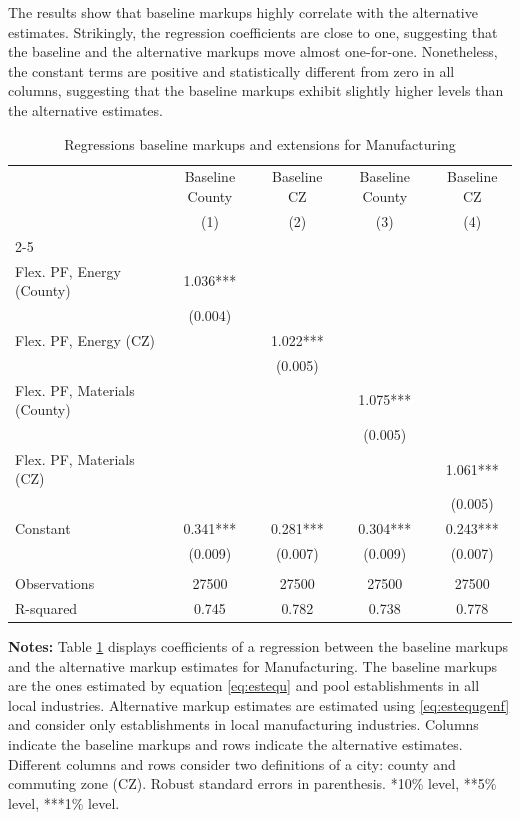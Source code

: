 The results show that baseline markups highly correlate with the alternative estimates. Strikingly, the regression coefficients are close to one, suggesting that the baseline and the alternative markups move almost one-for-one. Nonetheless, the constant terms are positive and statistically different from zero in all columns, suggesting that the baseline markups exhibit slightly higher levels than the alternative estimates.

\begin{table}[H]
	\centering
	\begin{threeparttable}
	\caption{Regressions baseline markups and extensions for Manufacturing}
	\begin{tabular}{lcccc}
		\hline
		\hline
		& Baseline County & Baseline CZ & Baseline County & Baseline CZ \\
		& (1)   & (2)   & (3)   & (4) \\ \cline{2-5}
		&       &       &       &  \\
		Flex. PF, Energy (County) & 1.036*** &       &       &  \\
		& (0.004) &       &       &  \\
		Flex. PF, Energy (CZ) &       & 1.022*** &       &  \\
		&       & (0.005) &       &  \\
		Flex. PF, Materials (County) &       &       & 1.075*** &  \\
		&       &       & (0.005) &  \\
		Flex. PF, Materials (CZ) &       &       &       & 1.061*** \\
		&       &       &       & (0.005) \\
		Constant & 0.341*** & 0.281*** & 0.304*** & 0.243*** \\
		& (0.009) & (0.007) & (0.009) & (0.007) \\
		&       &       &       &  \\
		Observations & 27500 & 27500 & 27500 & 27500 \\
		R-squared & 0.745 & 0.782 & 0.738 & 0.778 \\
		\hline
		\hline
	\end{tabular}%
	\label{tab:corrrob}%
\begin{tablenotes}
	\item \footnotesize{\textbf{Notes:} Table \ref{tab:corrrob} displays coefficients of a regression between the baseline markups and the alternative markup estimates for Manufacturing. The baseline markups are the ones estimated by equation \eqref{eq:estequ} and pool establishments in all local industries. Alternative markup estimates are estimated using \eqref{eq:estequgenf} and consider only establishments in local manufacturing industries. Columns indicate the baseline markups and rows indicate the alternative estimates. Different columns and rows consider two definitions of a city: county and commuting zone (CZ). Robust standard errors in parenthesis. *10\% level, **5\% level, ***1\% level.
	}
\end{tablenotes}
\end{threeparttable}
\end{table}%

